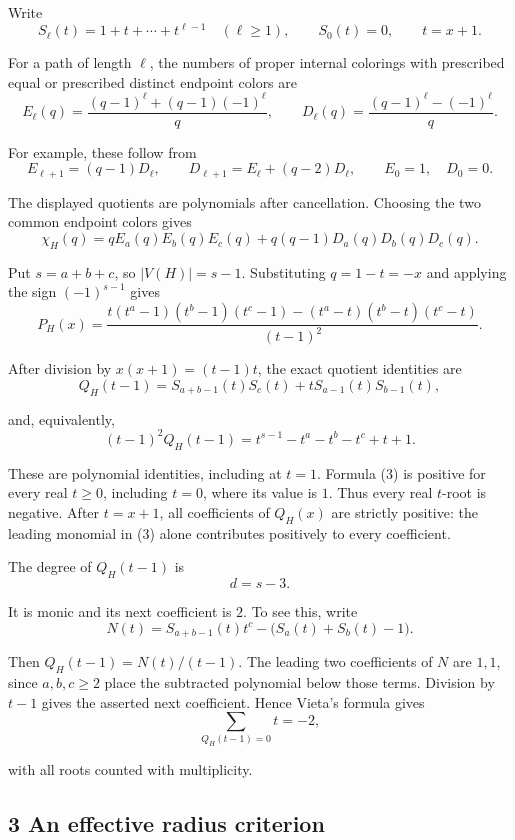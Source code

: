 \documentclass[
  11pt,
  a4paper,
]{article}
\begin{document}
Write
\nopagebreak
\[
S_\ell(t)=1+t+\cdots+t^{\ell-1}\quad(\ell\geq1),
\qquad S_0(t)=0,\qquad t=x+1.
\]

For a path of length \(\ell\), the numbers of proper internal colorings
with prescribed equal or prescribed distinct endpoint colors are
\nopagebreak
\[
E_\ell(q)=\frac{(q-1)^\ell+(q-1)(-1)^\ell}{q},\qquad
D_\ell(q)=\frac{(q-1)^\ell-(-1)^\ell}{q}.
\]

For example, these follow from
\nopagebreak
\[
E_{\ell+1}=(q-1)D_\ell,\qquad
D_{\ell+1}=E_\ell+(q-2)D_\ell,
\qquad E_0=1,\quad D_0=0.
\]

The displayed quotients are polynomials after cancellation. Choosing the
two common endpoint colors gives
\nopagebreak
\[
\chi_H(q)=qE_a(q)E_b(q)E_c(q)
+q(q-1)D_a(q)D_b(q)D_c(q).
\]

Put \(s=a+b+c\), so \(|V(H)|=s-1\). Substituting \(q=1-t=-x\) and
applying the sign \((-1)^{s-1}\) gives
\nopagebreak
\[
P_H(x)=\frac{t(t^a-1)(t^b-1)(t^c-1)
-(t^a-t)(t^b-t)(t^c-t)}{(t-1)^2}.
\]

After division by \(x(x+1)=(t-1)t\), the exact quotient identities are
\nopagebreak
\[
Q_H(t-1)=S_{a+b-1}(t)S_c(t)
+tS_{a-1}(t)S_{b-1}(t),\tag{3}
\]

and, equivalently,
\nopagebreak
\[
(t-1)^2Q_H(t-1)
=t^{s-1}-t^a-t^b-t^c+t+1.\tag{4}
\]

These are polynomial identities, including at \(t=1\). Formula (3) is
positive for every real \(t\geq0\), including \(t=0\), where its value
is \(1\). Thus every real \(t\)-root is negative. After \(t=x+1\), all
coefficients of \(Q_H(x)\) are strictly positive: the leading monomial
in (3) alone contributes positively to every coefficient.

The degree of \(Q_H(t-1)\) is
\nopagebreak
\[
d=s-3.
\]

It is monic and its next coefficient is \(2\). To see this, write
\nopagebreak
\[
N(t)=S_{a+b-1}(t)t^c-\bigl(S_a(t)+S_b(t)-1\bigr).
\]

Then \(Q_H(t-1)=N(t)/(t-1)\). The leading two coefficients of \(N\) are
\(1,1\), since \(a,b,c\geq2\) place the subtracted polynomial below
those terms. Division by \(t-1\) gives the asserted next coefficient.
Hence Vieta's formula gives
\nopagebreak
\[
\sum_{Q_H(t-1)=0}t=-2,\tag{5}
\]

with all roots counted with multiplicity.

\subsection{3 An effective radius
criterion}\label{an-effective-radius-criterion}
\end{document}
